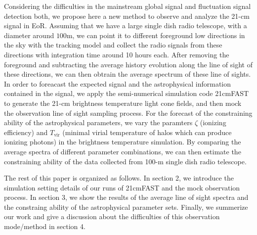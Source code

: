Considering the difficulties in the mainstream global signal and fluctuation signal detection both, we propose here a new method to observe and analyze the 21-cm signal in EoR. Assuming that we have a large single dish radio telescope, with a diameter around $100 \text{m}$, we can point it to different foreground low directions in the sky with the tracking model and collect the radio signals from these directions with integration time around 10 hours each. After removing the foreground and subtracting the average history evolution along the line of sight of these directions, we can then obtrain the average spectrum of these line of sights. In order to foreacast the expected signal and the astrophysical information contained in the signal, we apply the semi-numerical simulation code 21cmFAST to generate the 21-cm brightness temperature light cone fields, and then mock the observation line of sight sampling process. For the forecast of the constraining ability of the astrophysical parameters, we vary the paramters $\zeta$ (ionizing efficiency) and $T_\text{vir}$  (minimal virial temperature of halos which can produce ionizing photons) in the brightness temperature simulation. By comparing the average spectra of different parameter combinations, we can then estimate the constraining ability of the data collected from 100-m single dish radio telescope.

The rest of this paper is organized as follows. In section 2, we introduce the simulation setting details of our runs of 21cmFAST and the mock observation process. In section 3, we show the results of the average line of sight spectra and the constraing ability of the astrophysical parameter sets. Finally, we summerize our work and give a discussion about the difficulties of this observation mode/method in section 4.